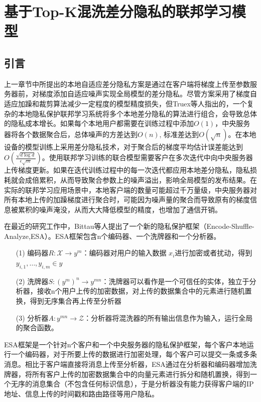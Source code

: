 \chapter{基于Top-K混洗差分隐私的联邦学习模型}
\label{ch4}
\section{引言}
上一章节中所提出的本地自适应差分隐私方案是通过在客户端将梯度上传至参数服务器前，对梯度添加自适应噪声实现全局模型的差分隐私。尽管方案采用了梯度自适应加躁和裁剪算法减少一定程度的模型精度损失，但Truex等人指出的，一个复杂的本地隐私保护联邦学习系统将多个本地差分隐私的算法进行组合，会导致总体的隐私成本增长。如果每个本地用户都需要在训练过程中添加$O(1)$，中央服务器将各个数据聚合后，总体噪声的方差达到$O(n)$, 标准差达到$O(\sqrt{n})$。在本地设备的模型训练上采用差分隐私技术，对于聚合后的梯度平均估计误差能达到$O\left(\frac{\sqrt{d \log d}}{\epsilon \sqrt{m}}\right)$。使用联邦学习训练的联合模型需要客户在多次迭代中向中央服务器上传梯度更新。如果在迭代训练过程中的每一次迭代都应用本地差分隐私，隐私损耗就会成倍累积，从而导致聚合参数上的噪声溢出，影响全局模型的发布结果。在实际的联邦学习应用场景中，本地客户端的数量可能超过千万量级，中央服务器对所有本地上传的加躁梯度进行聚合时，可能因为噪声量的聚合而导致原有的梯度信息被累积的噪声淹没，从而大大降低模型的精度，也增加了通信开销。

在最近的研究工作中，Bittau等人提出了一个新的隐私保护框架（Encode-Shuffle-Analyze,ESA）。ESA框架包含n个编码器、一个洗牌器和一个分析器。
\begin{enumerate}
\item [(1)] 编码器$R: \mathcal{X} \rightarrow y^{m}$：编码器对用户的输入数据 $x_{i}$进行加密或者扰动，得到$y_{i, 1}, \ldots, y_{i, m} \in y$
\item [(2)] 洗牌器$S:\left(y^{m}\right)^{n} \rightarrow y^{m n}$：洗牌器可以看作是一个可信任的实体，独立于分析器，接收n个用户上传的加密数据，对上传的数据集合中的元素进行随机置换，得到无序集合再上传至分析器
\item [(3)] 分析器$A: y^{m n} \rightarrow \mathcal{Z}$：分析器将混洗器的所有输出信息作为输入，运行全局的聚合函数。
\end{enumerate}

ESA框架是一个针对n个客户和一个中央服务器的隐私保护框架，每个客户本地运行一个编码器，对于所要上传的数据进行加密处理，每个客户可以提交一条或多条消息。相比于客户端直接将消息上传至分析器，ESA通过在分析器和编码器增加洗牌器，将所有客户上传的加密数据集合中的向量元素进行拆分和随机置换，得到一个无序的消息集合（不包含任何标识信息），于是分析器没有能力获得客户端的IP地址、信息上传的时间戳和路由路径等用户隐私。

